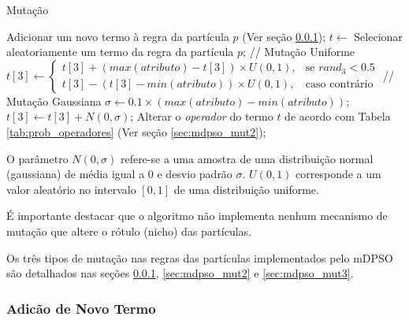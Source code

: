 \documentclass[
	12pt,				%
	openany,			%
	oneside,	
	a4paper,			%
	brazil,				%
	]{unimontes-ppgmsc-abntex2}
\begin{document}
\begin{algorithm}[ht]
\caption{Mutação}
\label{alg:mut}
\begin{algorithmic}[1]
	\State Adicionar um novo termo à regra da partícula $p$ (Ver seção \ref{sec:mdpso_mut1});
\Else
  \State $t \leftarrow$ Selecionar aleatoriamente um termo da regra da partícula $p$;
          \State // Mutação Uniforme  
          \State $t[3] \leftarrow \begin{cases} 
          				             t[3] + (max(atributo) - t[3]) \times U{(0, 1)}, & \mbox{se } rand_3 < 0.5 \\
          				             t[3] - (t[3] - min(atributo)) \times U{(0, 1)}, & \mbox{caso contrário}
          		                   \end{cases}$    
      \Else
          \State // Mutação Gaussiana
          \State $\sigma \leftarrow 0.1 \times (max(atributo) - min(atributo))$;
          \State $t[3] \leftarrow t[3] + N(0, \sigma)$;  
      \EndIf
  \Else
      \State Alterar o {\em operador} do termo $t$ de acordo com Tabela \ref{tab:prob_operadores} (Ver seção \ref{sec:mdpso_mut2});
  \EndIf
\EndIf
\end{algorithmic}
\end{algorithm}

O parâmetro $N(0, \sigma)$ refere-se a uma amostra de uma distribuição normal (gaussiana) de média igual a 0 e desvio padrão $\sigma$. $U{(0, 1)}$ corresponde a um valor aleatório no intervalo $[0,1]$ de uma distribuição uniforme.

É importante destacar que o algoritmo não implementa nenhum mecanismo de mutação que altere o rótulo (nicho) das partículas. 

Os três tipos de mutação nas regras das partículas implementados pelo mDPSO são detalhados nas seções \ref{sec:mdpso_mut1}, \ref{sec:mdpso_mut2} e \ref{sec:mdpso_mut3}.

\subsubsection{Adicão de Novo Termo}
\label{sec:mdpso_mut1} 

\end{document}
